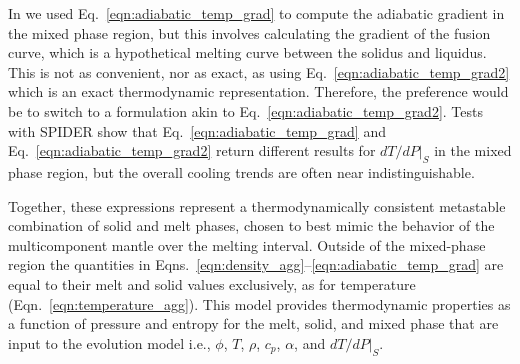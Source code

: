 In \cite{BSW18,BKW19} we used Eq.~\ref{eqn:adiabatic_temp_grad} to compute the adiabatic gradient in the mixed phase region, but this involves calculating the gradient of the fusion curve, which is a hypothetical melting curve between the solidus and liquidus.  This is not as convenient, nor as exact, as using Eq.~\ref{eqn:adiabatic_temp_grad2} which is an exact thermodynamic representation.  Therefore, the preference would be to switch to a formulation akin to Eq.~\ref{eqn:adiabatic_temp_grad2}.  Tests with SPIDER show that  Eq.~\ref{eqn:adiabatic_temp_grad} and  Eq.~\ref{eqn:adiabatic_temp_grad2} return different results for $dT/dP|_S$ in the mixed phase region, but the overall cooling trends are often near indistinguishable.

Together, these expressions represent a thermodynamically consistent metastable combination of solid and melt phases, chosen to best mimic the behavior of the multicomponent mantle over the melting interval.  Outside of the mixed-phase region the quantities in Eqns.~\ref{eqn:density_agg}--\ref{eqn:adiabatic_temp_grad} are equal to their melt and solid values exclusively, as for temperature (Eqn.~\ref{eqn:temperature_agg}).  This model provides thermodynamic properties as a function of pressure and entropy for the melt, solid, and mixed phase that are input to the evolution model i.e., $\phi$, $T$, $\rho$, $c_p$, $\alpha$, and $dT/dP|_S$.

